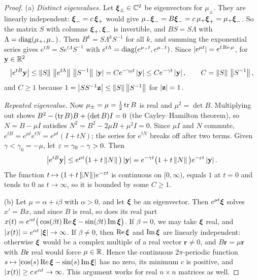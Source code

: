 \begin{proof}
(a) \emph{Distinct eigenvalues.} Let $\boldsymbol{\xi}_\pm\in\mathbb{C}^2$ be eigenvectors for
$\mu_\pm$. They are linearly independent: $\boldsymbol{\xi}_-=c\,\boldsymbol{\xi}_+$ would give
$\mu_-\boldsymbol{\xi}_-=B\boldsymbol{\xi}_-=c\,\mu_+\boldsymbol{\xi}_+=\mu_+\boldsymbol{\xi}_-$. So the matrix $S$ with columns
$\boldsymbol{\xi}_+,\boldsymbol{\xi}_-$ is invertible, and $BS=S\Lambda$ with $\Lambda=\operatorname{diag}(\mu_+,\mu_-)$.
Then $B^k=S\Lambda^kS^{-1}$ for all $k$, and summing the exponential series gives
$e^{tB}=Se^{t\Lambda}S^{-1}$ with $e^{t\Lambda}=\operatorname{diag}(e^{\mu_+t},e^{\mu_-t})$. Since
$\left\lvert e^{\mu t}\right\rvert=e^{t\operatorname{Re}\mu}$, for $\mathbf y\in\mathbb{R}^2$
\begin{equation*}
  \left\lvert e^{tB}\mathbf y\right\rvert\le\left\lVert S\right\rVert\,\left\lVert e^{t\Lambda}\right\rVert\,\left\lVert S^{-1}\right\rVert\,\left\lvert \mathbf y\right\rvert
  = Ce^{-\gamma_0t}\left\lvert \mathbf y\right\rvert\le Ce^{-\gamma t}\left\lvert \mathbf y\right\rvert,
  \qquad C=\left\lVert S\right\rVert\,\left\lVert S^{-1}\right\rVert,
\end{equation*}
and $C\ge1$ because $1=\left\lvert SS^{-1}\mathbf z\right\rvert\le\left\lVert S\right\rVert\left\lVert S^{-1}\right\rVert$ for
$\left\lvert \mathbf z\right\rvert=1$.

\emph{Repeated eigenvalue.} Now $\mu_\pm=\mu=\frac12\operatorname{tr} B$ is real and
$\mu^2=\det B$. Multiplying out shows $B^2-(\operatorname{tr} B)B+(\det B)I=0$ (the
Cayley--Hamilton theorem), so $N=B-\mu I$ satisfies
$N^2=B^2-2\mu B+\mu^2I=0$. Since $\mu I$ and $N$ commute,
$e^{tB}=e^{\mu t}e^{tN}=e^{\mu t}(I+tN)$; the series for $e^{tN}$ breaks off after
two terms. Given $\gamma<\gamma_0=-\mu$, let $\varepsilon=\gamma_0-\gamma>0$. Then
\begin{equation*}
  \left\lvert e^{tB}\mathbf y\right\rvert\le e^{\mu t}\big(1+t\left\lVert N\right\rVert\big)\left\lvert \mathbf y\right\rvert
  = e^{-\gamma t}\big(1+t\left\lVert N\right\rVert\big)e^{-\varepsilon t}\left\lvert \mathbf y\right\rvert.
\end{equation*}
The function $t\mapsto(1+t\left\lVert N\right\rVert)e^{-\varepsilon t}$ is continuous on $[0,\infty)$,
equals $1$ at $t=0$ and tends to $0$ as $t\to\infty$, so it is bounded by some
$C\ge1$.

(b) Let $\mu=\alpha+i\beta$ with $\alpha>0$, and let $\boldsymbol{\xi}$ be an eigenvector.
Then $e^{\mu t}\boldsymbol{\xi}$ solves $x'=Bx$, and since $B$ is real, so does its real part
$x(t)=e^{\alpha t}\big(\cos(\beta t)\operatorname{Re}\boldsymbol{\xi}-\sin(\beta t)\operatorname{Im}\boldsymbol{\xi}\big)$. If
$\beta=0$, we may take $\boldsymbol{\xi}$ real, and $\left\lvert x(t)\right\rvert=e^{\alpha t}\left\lvert \boldsymbol{\xi}\right\rvert\to\infty$.
If $\beta\neq0$, then $\operatorname{Re}\boldsymbol{\xi}$ and $\operatorname{Im}\boldsymbol{\xi}$ are linearly independent: otherwise
$\boldsymbol{\xi}$ would be a complex multiple of a real vector $\mathbf r\neq0$, and
$B\mathbf r=\mu\mathbf r$ with $B\mathbf r$ real would force $\mu\in\mathbb{R}$. Hence the
continuous $2\pi$-periodic function $s\mapsto\left\lvert \cos(s)\operatorname{Re}\boldsymbol{\xi}-\sin(s)\operatorname{Im}\boldsymbol{\xi}\right\rvert$
has no zero, its minimum $c$ is positive, and $\left\lvert x(t)\right\rvert\ge c\,e^{\alpha t}\to\infty$.
This argument works for real $n\times n$ matrices as well.
\end{proof}
